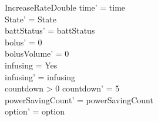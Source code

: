 \begin{schema}{IncreaseRateDouble}
	time' = time\\ 
	State' = State\\
	battStatus' = battStatus\\
	bolus' = 0\\
	bolusVolume' = 0\\
	infusing = Yes\\
	infusing' = infusing\\
	countdown > 0 \land countdown' = 5\\
	powerSavingCount' = powerSavingCount\\ option' = option\\
\end{schema}

